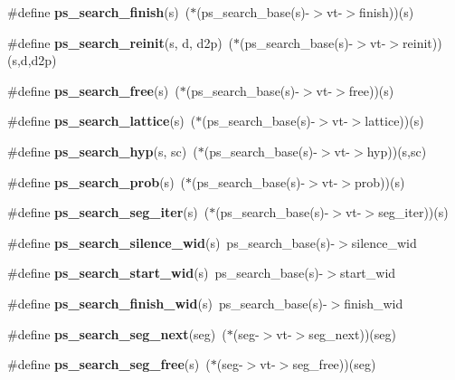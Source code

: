 \begin{DoxyCompactItemize}
\item 
\mbox{\label{pocketsphinx__internal_8h_a52d4cf988efa2211c86a2168de346032}} 
\#define {\bfseries ps\+\_\+search\+\_\+finish}(s)~($\ast$(ps\+\_\+search\+\_\+base(s)-\/$>$vt-\/$>$finish))(s)
\item 
\mbox{\label{pocketsphinx__internal_8h_a071483ece6369091cc50334f5be1124b}} 
\#define {\bfseries ps\+\_\+search\+\_\+reinit}(s,  d,  d2p)~($\ast$(ps\+\_\+search\+\_\+base(s)-\/$>$vt-\/$>$reinit))(s,d,d2p)
\item 
\mbox{\label{pocketsphinx__internal_8h_ac5475853d99524bb4c933c42df58118b}} 
\#define {\bfseries ps\+\_\+search\+\_\+free}(s)~($\ast$(ps\+\_\+search\+\_\+base(s)-\/$>$vt-\/$>$free))(s)
\item 
\mbox{\label{pocketsphinx__internal_8h_ac821fb65e0c2ef778a4b8b49ecf30e11}} 
\#define {\bfseries ps\+\_\+search\+\_\+lattice}(s)~($\ast$(ps\+\_\+search\+\_\+base(s)-\/$>$vt-\/$>$lattice))(s)
\item 
\mbox{\label{pocketsphinx__internal_8h_ac6274740077a81aa3c2441cbba39482b}} 
\#define {\bfseries ps\+\_\+search\+\_\+hyp}(s,  sc)~($\ast$(ps\+\_\+search\+\_\+base(s)-\/$>$vt-\/$>$hyp))(s,sc)
\item 
\mbox{\label{pocketsphinx__internal_8h_a3fb9e1a2036effd2f15cd088140c750f}} 
\#define {\bfseries ps\+\_\+search\+\_\+prob}(s)~($\ast$(ps\+\_\+search\+\_\+base(s)-\/$>$vt-\/$>$prob))(s)
\item 
\mbox{\label{pocketsphinx__internal_8h_a2ea147eb80a4574c0d363db8abe9580c}} 
\#define {\bfseries ps\+\_\+search\+\_\+seg\+\_\+iter}(s)~($\ast$(ps\+\_\+search\+\_\+base(s)-\/$>$vt-\/$>$seg\+\_\+iter))(s)
\item 
\mbox{\label{pocketsphinx__internal_8h_aab989bd93fe7abcc165bc92d6ccc1bac}} 
\#define {\bfseries ps\+\_\+search\+\_\+silence\+\_\+wid}(s)~ps\+\_\+search\+\_\+base(s)-\/$>$silence\+\_\+wid
\item 
\mbox{\label{pocketsphinx__internal_8h_a6dc7da2c1bc3bfb15d5fbe3618a4e3d4}} 
\#define {\bfseries ps\+\_\+search\+\_\+start\+\_\+wid}(s)~ps\+\_\+search\+\_\+base(s)-\/$>$start\+\_\+wid
\item 
\mbox{\label{pocketsphinx__internal_8h_aaeee657147579bc652c494989622f6b4}} 
\#define {\bfseries ps\+\_\+search\+\_\+finish\+\_\+wid}(s)~ps\+\_\+search\+\_\+base(s)-\/$>$finish\+\_\+wid
\item 
\mbox{\label{pocketsphinx__internal_8h_ae7c150fad9fc9e8a13e632a1386b8f56}} 
\#define {\bfseries ps\+\_\+search\+\_\+seg\+\_\+next}(seg)~($\ast$(seg-\/$>$vt-\/$>$seg\+\_\+next))(seg)
\item 
\mbox{\label{pocketsphinx__internal_8h_a38f6b225e3eace3793cdae8135b0aaab}} 
\#define {\bfseries ps\+\_\+search\+\_\+seg\+\_\+free}(s)~($\ast$(seg-\/$>$vt-\/$>$seg\+\_\+free))(seg)
\end{DoxyCompactItemize}

